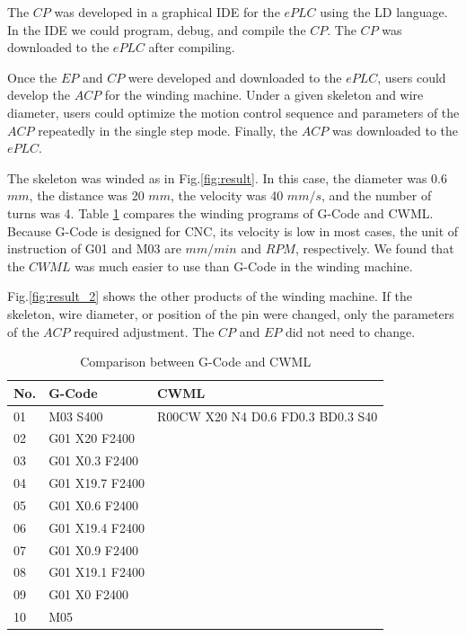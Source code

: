 \documentclass[journal]{IEEEtran}
\begin{document}
The $CP$ was developed in a graphical IDE for the $ePLC$ using the LD language. In the IDE we could program, debug, and compile\cite{A40} the $CP$.
The $CP$ was downloaded to the $ePLC$ after compiling.


Once the $EP$ and $CP$ were developed and downloaded to the $ePLC$, users could develop the $ACP$ for the winding machine. Under a given skeleton and wire diameter, users could optimize the motion control sequence and parameters of the $ACP$ repeatedly in the single step mode. Finally, the $ACP$ was downloaded to the $ePLC$. 

The skeleton was winded as in Fig.\ref{fig:result}. In this case, the diameter was 0.6 $mm$, the distance was 20 $mm$, the velocity was 40 $mm/s$, and the number of turns was 4. Table \ref{table:ComparisonG} compares the winding programs of G-Code and CWML. Because G-Code is designed for CNC, its velocity is low in most cases, the unit of instruction of G01 and M03 are $mm/min$ and $RPM$, respectively. We found that the $CWML$ was much easier to use than G-Code in the winding machine.

Fig.\ref{fig:result_2}  shows the other products of the winding machine. If the skeleton, wire diameter, or position of the pin were changed, only the parameters of the $ACP$ required adjustment. The $CP$ and $EP$ did not need to change. 

\begin{table}
	\scriptsize \caption{Comparison between G-Code and CWML}
	\label{table:ComparisonG}
	\begin{center}
		\renewcommand{\arraystretch}{1.4}
		\setlength\tabcolsep{3pt}
		\begin{tabular}{|p{0.3cm}|p{2.5cm}|p{4.2cm}|}
			\hline
			No. & G-Code & CWML\\
			\hline
			01  & M03 S400 & R00CW X20 N4 D0.6 FD0.3 BD0.3 S40\\
			\hline
			02  & G01 X20 F2400 &\\
			\hline
			03  & G01 X0.3 F2400 &\\
			\hline
			04  & G01 X19.7 F2400 &\\
			\hline
			05  & G01 X0.6 F2400 &\\
			\hline
			06  & G01 X19.4 F2400 &\\
			\hline
			07  & G01 X0.9 F2400 &\\
			\hline
			08  & G01 X19.1 F2400 &\\
			\hline
			09  & G01 X0 F2400 &\\
			\hline
			10  & M05 &\\
			\hline
		\end{tabular}
	\end{center}
\end{table}
\end{document}
